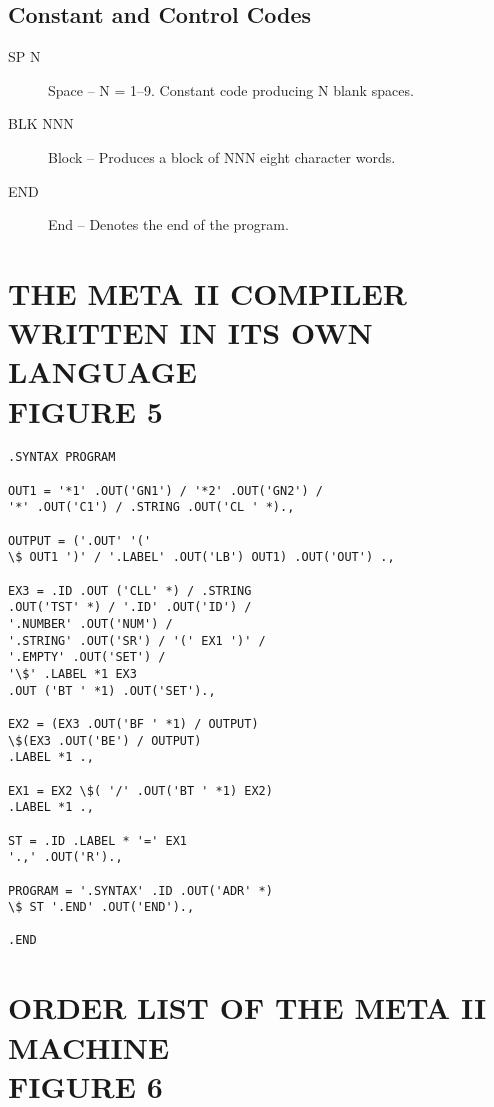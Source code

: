 \documentclass[twocolumn]{article}
\begin{document}
\subsection{Constant and Control Codes}
\begin{description}
\item[SP  N]      Space -- N = 1--9. Constant code producing N blank spaces.

\item[BLK NNN]    Block -- Produces a block of NNN eight character words.

\item[END]        End -- Denotes the end of the program.
\end{description}

\pagebreak

\section{THE META II COMPILER WRITTEN IN ITS OWN LANGUAGE\\FIGURE 5}

\begin{verbatim}
.SYNTAX PROGRAM

OUT1 = '*1' .OUT('GN1') / '*2' .OUT('GN2') /
'*' .OUT('C1') / .STRING .OUT('CL ' *).,

OUTPUT = ('.OUT' '('
\$ OUT1 ')' / '.LABEL' .OUT('LB') OUT1) .OUT('OUT') .,

EX3 = .ID .OUT ('CLL' *) / .STRING
.OUT('TST' *) / '.ID' .OUT('ID') /
'.NUMBER' .OUT('NUM') /
'.STRING' .OUT('SR') / '(' EX1 ')' /
'.EMPTY' .OUT('SET') /
'\$' .LABEL *1 EX3
.OUT ('BT ' *1) .OUT('SET').,

EX2 = (EX3 .OUT('BF ' *1) / OUTPUT)
\$(EX3 .OUT('BE') / OUTPUT)
.LABEL *1 .,

EX1 = EX2 \$( '/' .OUT('BT ' *1) EX2)
.LABEL *1 .,

ST = .ID .LABEL * '=' EX1
'.,' .OUT('R').,

PROGRAM = '.SYNTAX' .ID .OUT('ADR' *)
\$ ST '.END' .OUT('END').,

.END
\end{verbatim}

\section{ORDER LIST OF THE META II MACHINE\\FIGURE 6}
\end{document}
